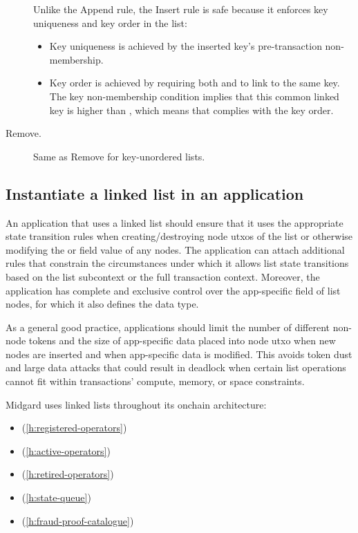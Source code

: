 \documentclass[../midgard.tex]{subfiles}
\begin{document}
\begin{description}
        Unlike the Append rule, the Insert rule is safe because it enforces key uniqueness and key order in the list:
        \begin{itemize}
            \item Key uniqueness is achieved by the inserted key's pre-transaction non-membership.
            \item Key order is achieved by requiring both  and  to link to the same key.
              The key non-membership condition implies that this common linked key is higher than , which means that  complies with the key order.
        \end{itemize}
    \item[Remove.] Same as Remove for key-unordered lists.
\end{description}

\subsection{Instantiate a linked list in an application}
\label{h:instantiate-list-in-application}

An application that uses a linked list should ensure that it uses the appropriate state transition rules when creating/destroying node utxos of the list or otherwise modifying the  or  field value of any nodes.
The application can attach additional rules that constrain the circumstances under which it allows list state transitions based on the list subcontext or the full transaction context.
Moreover, the application has complete and exclusive control over the app-specific  field of list nodes, for which it also defines the data type.

As a general good practice, applications should limit the number of different non-node tokens and the size of app-specific data placed into node utxo when new nodes are inserted and when app-specific data is modified.
This avoids token dust and large data attacks that could result in deadlock when certain list operations cannot fit within transactions' compute, memory, or space constraints.

Midgard uses linked lists throughout its onchain architecture:
\begin{itemize}
    \item {} (\cref{h:registered-operators})
    \item {} (\cref{h:active-operators})
    \item {} (\cref{h:retired-operators})
    \item {} (\cref{h:state-queue})
    \item {} (\cref{h:fraud-proof-catalogue})
\end{itemize}
\end{document}
